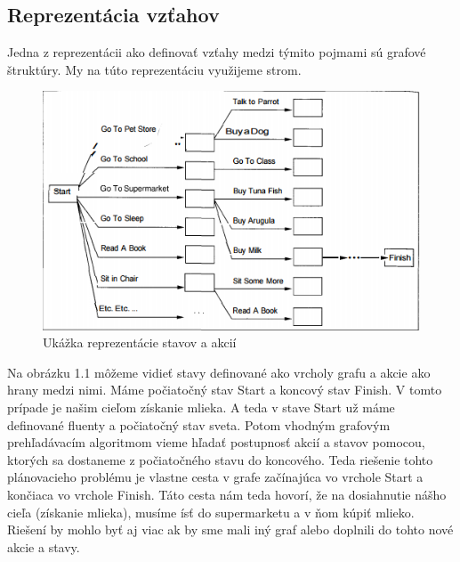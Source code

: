 \subsection{Reprezentácia vzťahov}
Jedna z reprezentácii ako definovať vzťahy medzi týmito pojmami sú grafové štruktúry. My na túto reprezentáciu využijeme strom.\par
\begin{figure}[ht] 
\begin{center}
\includegraphics[scale=1.0]{img/plan.png}
\caption{Ukážka reprezentácie stavov a akcií \cite{approach}}
\label{fig:ch11}
\end{center}
\end{figure}
Na obrázku 1.1 môžeme vidieť stavy definované ako vrcholy grafu a akcie ako hrany medzi nimi. Máme počiatočný stav Start a koncový stav Finish. V tomto prípade je našim cieľom získanie mlieka. A teda v stave Start už máme definované fluenty a počiatočný stav sveta. Potom vhodným grafovým prehľadávacím algoritmom vieme hľadať postupnosť akcií a stavov pomocou, ktorých sa dostaneme z počiatočného stavu do koncového. Teda riešenie tohto plánovacieho problému je vlastne cesta v grafe začínajúca vo vrchole Start a končiaca vo vrchole Finish. Táto cesta nám teda hovorí, že na dosiahnutie nášho cieľa (získanie mlieka), musíme ísť do supermarketu a v ňom kúpiť mlieko. Riešení by mohlo byť aj viac ak by sme mali iný graf alebo doplnili do tohto nové akcie a stavy.
